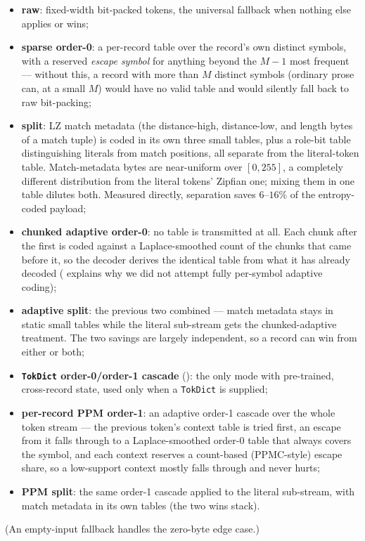 \documentclass[10pt,twocolumn]{article}
\theoremstyle{plain}
\theoremstyle{definition}
\begin{document}
\begin{itemize}\itemsep1pt
\item \textbf{raw}: fixed-width bit-packed tokens, the universal fallback when
nothing else applies or wins;
\item \textbf{sparse order-0}: a per-record table over the record's own distinct
symbols, with a reserved \emph{escape symbol} for anything beyond the $M-1$ most
frequent --- without this, a record with more than $M$ distinct symbols (ordinary
prose can, at a small $M$) would have no valid table and would silently fall back to
raw bit-packing;
\item \textbf{split}: LZ match metadata (the distance-high, distance-low, and length
bytes of a match tuple) is coded in its own three small tables, plus a role-bit table
distinguishing literals from match positions, all separate from the literal-token
table. Match-metadata bytes are near-uniform over $[0,255]$, a completely different
distribution from the literal tokens' Zipfian one; mixing them in one table dilutes
both. Measured directly, separation saves $6$--$16\%$ of the entropy-coded payload;
\item \textbf{chunked adaptive order-0}: no table is transmitted at all. Each chunk
after the first is coded against a Laplace-smoothed count of the chunks that came
before it, so the decoder derives the identical table from what it has already
decoded ( explains why we did not attempt fully per-symbol adaptive
coding);
\item \textbf{adaptive split}: the previous two combined --- match metadata stays in
static small tables while the literal sub-stream gets the chunked-adaptive treatment.
The two savings are largely independent, so a record can win from either or both;
\item \textbf{\texttt{TokDict} order-0/order-1 cascade} (): the
only mode with pre-trained, cross-record state, used only when a \texttt{TokDict} is
supplied;
\item \textbf{per-record PPM order-1}: an adaptive order-1 cascade over the whole
token stream --- the previous token's context table is tried first, an escape from
it falls through to a Laplace-smoothed order-0 table that always covers the symbol,
and each context reserves a count-based (PPMC-style) escape share, so a low-support
context mostly falls through and never hurts;
\item \textbf{PPM split}: the same order-1 cascade applied to the literal
sub-stream, with match metadata in its own tables (the two wins stack).
\end{itemize}
(An empty-input fallback handles the zero-byte edge case.)
\end{document}

